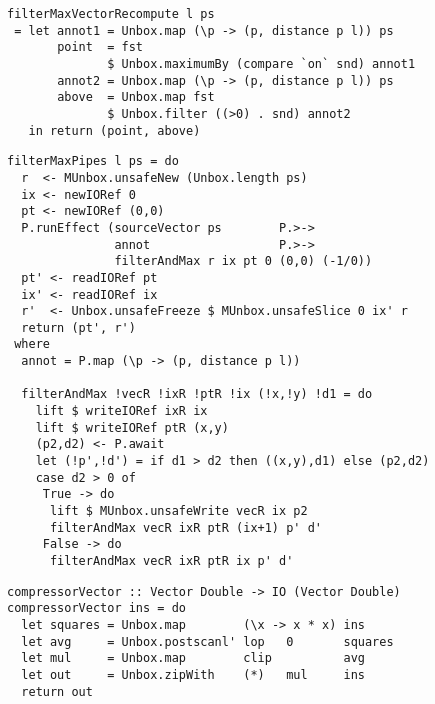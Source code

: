\begin{lstlisting}[float=ht,label=l:a:bench:filterMaxVectorRecompute,caption=Vector recomputed distances implementation of \Hs/filterMax/]
filterMaxVectorRecompute l ps
 = let annot1 = Unbox.map (\p -> (p, distance p l)) ps
       point  = fst
              $ Unbox.maximumBy (compare `on` snd) annot1
       annot2 = Unbox.map (\p -> (p, distance p l)) ps
       above  = Unbox.map fst
              $ Unbox.filter ((>0) . snd) annot2
   in return (point, above)
\end{lstlisting}

\begin{lstlisting}[float=ht,label=l:a:bench:filterMaxPipes,caption=Pipes implementation of \Hs/filterMax/]
filterMaxPipes l ps = do
  r  <- MUnbox.unsafeNew (Unbox.length ps)
  ix <- newIORef 0
  pt <- newIORef (0,0)
  P.runEffect (sourceVector ps        P.>->
               annot                  P.>->
               filterAndMax r ix pt 0 (0,0) (-1/0))
  pt' <- readIORef pt
  ix' <- readIORef ix
  r'  <- Unbox.unsafeFreeze $ MUnbox.unsafeSlice 0 ix' r
  return (pt', r')
 where
  annot = P.map (\p -> (p, distance p l))

  filterAndMax !vecR !ixR !ptR !ix (!x,!y) !d1 = do
    lift $ writeIORef ixR ix
    lift $ writeIORef ptR (x,y)
    (p2,d2) <- P.await
    let (!p',!d') = if d1 > d2 then ((x,y),d1) else (p2,d2)
    case d2 > 0 of
     True -> do
      lift $ MUnbox.unsafeWrite vecR ix p2
      filterAndMax vecR ixR ptR (ix+1) p' d'
     False -> do
      filterAndMax vecR ixR ptR ix p' d'
\end{lstlisting}

% 


\begin{lstlisting}[float=ht,label=l:a:bench:compressorVector,caption=Vector implementation of \Hs/compressor/]
compressorVector :: Vector Double -> IO (Vector Double)
compressorVector ins = do
  let squares = Unbox.map        (\x -> x * x) ins
  let avg     = Unbox.postscanl' lop   0       squares
  let mul     = Unbox.map        clip          avg
  let out     = Unbox.zipWith    (*)   mul     ins
  return out
\end{lstlisting}

